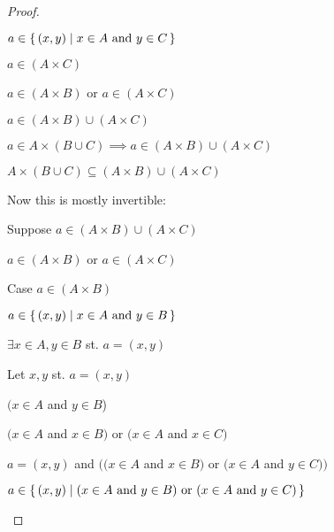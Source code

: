 \documentclass[../../main.tex]{subfiles}
\begin{document}
\begin{enumerate}
\begin{proof}
\begin{linebyline}
\begin{linebyline}
\begin{linebyline}
                        \begin{linebyline}
                            \item $a \in \Set{(x,y)}{x \in A$ and $y \in C}$
                            \item $a \in (A \times C)$
                        \end{linebyline}
                        \item $a \in (A \times B)$ or $a \in (A \times C)$
                        \item $a \in (A \times B) \cup (A \times C)$
                    \end{linebyline}
                \end{linebyline}
                \item $a \in A \times (B \cup C) \implies a \in (A \times B) \cup (A \times C)$
                \item $A \times (B \cup C) \subseteq (A \times B) \cup (A \times C)$
            \end{linebyline}
            \item Now this is mostly invertible:
            \begin{linebyline}[resume]
                \item Suppose $a \in (A \times B) \cup (A \times C)$
                \begin{linebyline}
                    \item $a \in (A \times B)$ or $a \in (A \times C)$
                    \item Case $a \in (A \times B)$
                    \begin{linebyline}
                        \item $a \in \Set{(x,y)}{x \in A$ and $y \in B}$
                        \item $\exists x \in A, y \in B $ st. $a = (x,y)$
                        \item Let $x, y$ st. $a = (x,y)$
                        \begin{linebyline}
                            \item $(x \in A$ and $y \in B$)
                            \item $(x \in A$ and $x \in B)$ or $(x \in A$ and $x \in C)$
                            \item $a = (x,y)$ and $\bigl( (x \in A$ and $x \in B)$ or $(x \in A$ and $y \in C) \bigr)$
                            \item $a \in \Set{(x,y)}{(x \in A$ and $y \in B)$ or $(x \in A$ and $y \in C)}$


\end{linebyline}
\end{linebyline}
\end{linebyline}
\end{linebyline}
\end{proof}
\end{enumerate}
\end{document}
